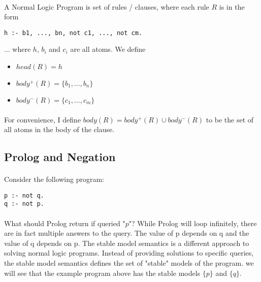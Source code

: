 \documentclass{article}
\theoremstyle{plain}
\theoremstyle{definition}
\begin{document}
\begin{multicols}{2}
\paragraph{} A Normal Logic Program is set of rules / clauses, where each rule $R$ is in the form

\begin{lstlisting}
h :- b1, ..., bn, not c1, ..., not cm.
\end{lstlisting}

\noindent ... where $h$, $b_i$ and $c_i$ are all atoms. We define 

\begin{itemize}
\item $head(R) = h$
\item $body^+(R) = \{ b_1, ..., b_n \}$
\item $body^-(R) = \{ c_1, ..., c_m \}$
\end{itemize}

\paragraph{} For convenience, I define $body(R) = body^+(R) \cup body^-(R)$ to be the set of all atoms in the body of the clause.

\subsection{Prolog and Negation}

\paragraph{} Consider the following program:

\begin{lstlisting}
p :- not q.
q :- not p.
\end{lstlisting}

\paragraph{} What should Prolog return if queried "$p$"? While Prolog will loop infinitely, there are in fact multiple answers to the query. The value of p depends on q and the value of q depends on p. The stable model semantics\cite{gelfond88} is a different approach to solving normal logic programs. Instead of providing solutions to specific queries, the stable model semantics defines the set of "stable" models of the program. we will see that the example program above has the stable models $\{p\}$ and $\{q\}$.


\end{multicols}
\end{document}
